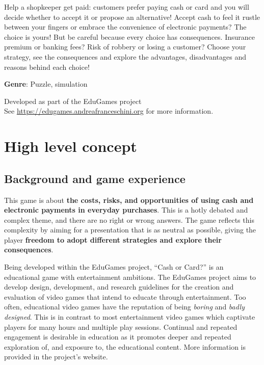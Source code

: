 \documentclass[a4paper,11pt]{article}
\begin{document}
\noindent Help a shopkeeper get paid: customers prefer paying cash or card and you will decide whether to accept it or propose an alternative! Accept cash to feel it rustle between your fingers or embrace the convenience of electronic payments? The choice is yours! But be careful because every choice has consequences. Insurance premium or banking fees? Risk of robbery or losing a customer? Choose your strategy, see the consequences and explore the advantages, disadvantages and reasons behind each choice!

\vspace{\baselineskip}\noindent\textbf{Genre}: Puzzle, simulation

\vspace{\baselineskip}\noindent Developed as part of the EduGames project\\See \url{https://edugames.andreafranceschini.org} for more information.

\section{High level concept}\label{high-level-concept}
\subsection{Background and game experience}\label{background}
This game is about \textbf{the costs, risks, and opportunities of using cash and electronic payments in everyday purchases}. This is a hotly debated and complex theme, and there are no right or wrong answers. The game reflects this complexity by aiming for a presentation that is as neutral as possible, giving the player \textbf{freedom to adopt different strategies and explore their consequences}.

Being developed within the EduGames project, ``Cash or Card?'' is an educational game with entertainment ambitions. The EduGames project aims to develop design, development, and research guidelines for the creation and evaluation of video games that intend to educate through entertainment. Too often, educational video games have the reputation of being \emph{boring} and \emph{badly designed}. This is in contrast to most entertainment video games which captivate players for many hours and multiple play sessions. Continual and repeated engagement is desirable in education as it promotes deeper and repeated exploration of, and exposure to, the educational content. More information is provided in the project's website.
\end{document}
